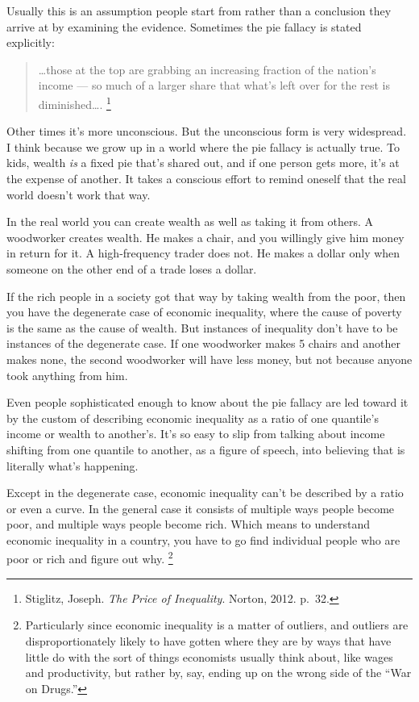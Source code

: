 Usually this is an assumption people start from rather than a conclusion
they arrive at by examining the evidence. Sometimes the pie fallacy is
stated explicitly:

\begin{quote}
\ldots those at the top are grabbing an increasing fraction of the
nation's income --- so much of a larger share that what's left over for
the rest is diminished\ldots. \footnote{Stiglitz, Joseph. \emph{The Price of Inequality}. Norton, 2012.
p.~32.}
\end{quote}

Other times it's more unconscious. But the unconscious form is very
widespread. I think because we grow up in a world where the pie fallacy
is actually true. To kids, wealth \emph{is} a fixed pie that's shared
out, and if one person gets more, it's at the expense of another. It
takes a conscious effort to remind oneself that the real world doesn't
work that way.

In the real world you can create wealth as well as taking it from
others. A woodworker creates wealth. He makes a chair, and you willingly
give him money in return for it. A high-frequency trader does not. He
makes a dollar only when someone on the other end of a trade loses a
dollar.

If the rich people in a society got that way by taking wealth from the
poor, then you have the degenerate case of economic inequality, where
the cause of poverty is the same as the cause of wealth. But instances
of inequality don't have to be instances of the degenerate case. If one
woodworker makes 5 chairs and another makes none, the second woodworker
will have less money, but not because anyone took anything from him.

Even people sophisticated enough to know about the pie fallacy are led
toward it by the custom of describing economic inequality as a ratio of
one quantile's income or wealth to another's. It's so easy to slip from
talking about income shifting from one quantile to another, as a figure
of speech, into believing that is literally what's happening.

Except in the degenerate case, economic inequality can't be described by
a ratio or even a curve. In the general case it consists of multiple
ways people become poor, and multiple ways people become rich. Which
means to understand economic inequality in a country, you have to go
find individual people who are poor or rich and figure out why.
\footnote{Particularly since economic inequality is a matter of outliers,
and outliers are disproportionately likely to have gotten where they are
by ways that have little do with the sort of things economists usually
think about, like wages and productivity, but rather by, say, ending up
on the wrong side of the ``War on Drugs.''}


